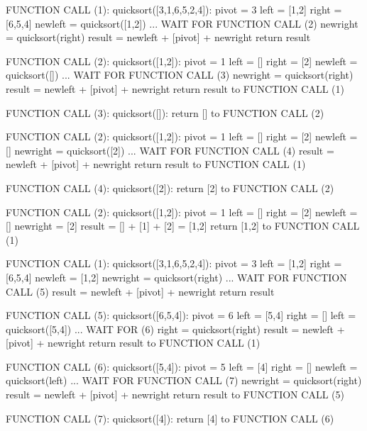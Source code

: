 \begin{console}
FUNCTION CALL (1): quicksort([3,1,6,5,2,4]):
pivot = 3
left = [1,2]
right = [6,5,4]
newleft = quicksort([1,2]) ... WAIT FOR FUNCTION CALL (2)
newright = quicksort(right)
result = newleft + [pivot] + newright
return result
\end{console}
\begin{console}
FUNCTION CALL (2): quicksort([1,2]):
pivot = 1
left = []
right = [2]
newleft = quicksort([]) ... WAIT FOR FUNCTION CALL (3)
newright = quicksort(right)
result = newleft + [pivot] + newright
return result to FUNCTION CALL (1)
\end{console}
\begin{console}
FUNCTION CALL (3): quicksort([]):
return [] to FUNCTION CALL (2)
\end{console}
\begin{console}
FUNCTION CALL (2): quicksort([1,2]):
pivot = 1
left = []
right = [2]
newleft = []
newright = quicksort([2]) ... WAIT FOR FUNCTION CALL (4)
result = newleft + [pivot] + newright
return result to FUNCTION CALL (1)
\end{console}
\begin{console}
FUNCTION CALL (4): quicksort([2]):
return [2] to FUNCTION CALL (2)
\end{console}
\begin{console}
FUNCTION CALL (2): quicksort([1,2]):
pivot = 1
left = []
right = [2]
newleft = []
newright = [2]
result = [] + [1] + [2] = [1,2]
return [1,2] to FUNCTION CALL (1)
\end{console}
\begin{console}
FUNCTION CALL (1): quicksort([3,1,6,5,2,4]):
pivot = 3
left = [1,2]
right = [6,5,4]
newleft = [1,2]
newright = quicksort(right) ... WAIT FOR FUNCTION CALL (5)
result = newleft + [pivot] + newright
return result
\end{console}
\begin{console}
FUNCTION CALL (5): quicksort([6,5,4]):
pivot = 6
left = [5,4]
right = []
left = quicksort([5,4]) ... WAIT FOR (6)
right = quicksort(right)
result = newleft + [pivot] + newright
return result to FUNCTION CALL (1)
\end{console}
\begin{console}
FUNCTION CALL (6): quicksort([5,4]):
pivot = 5
left = [4]
right = []
newleft = quicksort(left) ... WAIT FOR FUNCTION CALL (7)
newright = quicksort(right)
result = newleft + [pivot] + newright
return result to FUNCTION CALL (5)
\end{console}
\begin{console}
FUNCTION CALL (7): quicksort([4]):
return [4] to FUNCTION CALL (6)
\end{console}
